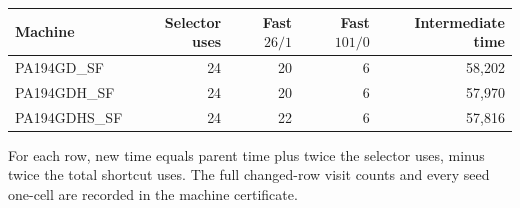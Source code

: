 \begin{center}
\begin{tabular}{@{}lrrrr@{}}
\toprule
Machine & Selector uses & Fast $26/1$ & Fast $101/0$ & Intermediate time\\\midrule
PA194GD\_SF & 24 & 20 & 6 & 58,202\\
PA194GDH\_SF & 24 & 20 & 6 & 57,970\\
PA194GDHS\_SF & 24 & 22 & 6 & 57,816\\
\bottomrule
\end{tabular}
\end{center}
For each row, new time equals parent time plus twice the selector uses,
minus twice the total shortcut uses. The full changed-row visit counts and
every seed one-cell are recorded in the machine certificate.
